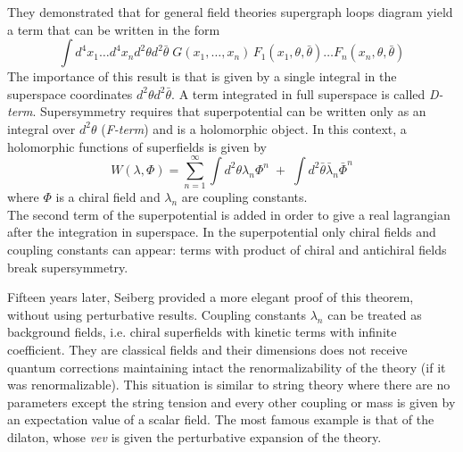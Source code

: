 They demonstrated that for general field theories supergraph loops diagram yield a term that can be written in the form
\begin{equation}
\int  d^4 x_1 \dots d^4 x_n d^2 \theta d^2 \bar{\theta} \; G (x_1 , \dots , x_n) \,F_1 ( x_1, \theta, \bar{\theta}) \dots  F_n ( x_n, \theta, \bar{\theta}) 
\end{equation} 
The importance of this result is that is given by a single integral in the superspace coordinates $d^2 \theta d^2 \bar{\theta }$.
A term integrated in full superspace is called \emph{D-term}.
Supersymmetry requires that superpotential can be written only as an integral over $d^2 \theta $ (\emph{F-term}) and is a holomorphic object.
In this context, a holomorphic functions of superfields is given by
\begin{equation}
 W (\lambda, \Phi) = \sum_{n=1}^{\infty}  \int d^2 \theta \lambda_n \Phi^n  \; +\; \int d^2 \bar{\theta} \bar{\lambda}_n {\bar{\Phi}}^n
 \end{equation} 
 where $\Phi$ is a chiral field and $\lambda_n$ are coupling constants.\\
 The second term of the superpotential is added in order to give a real lagrangian after the integration in superspace.
 In the superpotential only chiral fields and coupling constants can appear: terms with product of chiral and antichiral fields break supersymmetry.


 Fifteen years later, Seiberg provided a more elegant proof of this theorem, without using perturbative results.
Coupling constants $\lambda_n$ can be treated as background fields, i.e. chiral superfields with kinetic terms with infinite coefficient.
They are classical fields and their dimensions does not receive quantum corrections maintaining intact the renormalizability of the theory (if it was renormalizable). 
This situation is similar to string theory where there are no parameters except the string tension and every other coupling or mass is given by an expectation value of a scalar field. 
The most famous example is that of the dilaton, whose \emph{vev} is given the perturbative expansion of the theory.  




\newpage